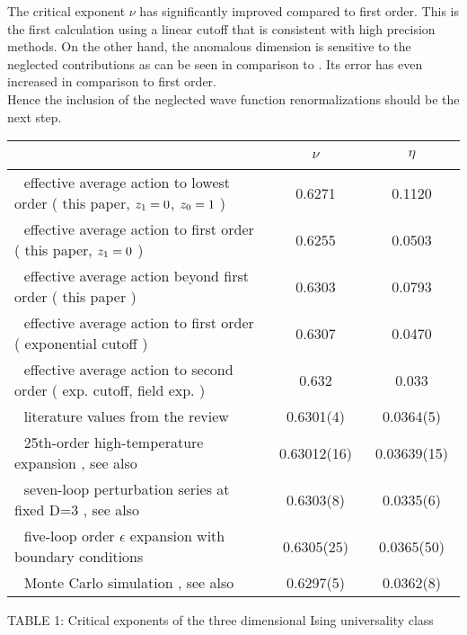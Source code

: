 \documentclass[a4paper,aps,prl,twocolumn,groupedaddress]{revtex4}
\begin{document}
\noindent
The critical exponent $\nu$ has significantly improved compared to 
first order. This is the first calculation using a linear cutoff that is consistent with
high precision methods. On the other hand, the anomalous dimension is sensitive to the 
neglected contributions as can be seen in comparison to \cite{Lit5a}.
Its error has even increased in comparison to first order. \\
Hence the inclusion of the neglected wave function renormalizations should be the next step.



\onecolumngrid
\begin{center}
\begin{tabular}{|l|c|c|}
\hline
~&$\nu$&$\eta$\\
\hline
$~~~$effective average action to lowest order ( this paper, $z_1=0$, $z_0=1$ )&0.6271&0.1120\\
$~~~$effective average action to first order ( this paper, $z_1=0$ )&0.6255&0.0503\\
$~~~$effective average action beyond first order ( this paper ) &0.6303&0.0793\\
$~~~$effective average action to first order ( exponential cutoff \cite{Lit7a} )&0.6307&0.0470\\
$~~~$effective average action to second order ( exp. cutoff, field exp. \cite{Lit5a} ) &0.632&0.033\\
\hline
$~~~$literature values from the review \cite{Lit7}&0.6301(4)&0.0364(5)\\
\hline
$~~~$25th-order high-temperature expansion \cite{HighT1}, see also \cite{HighT2}&$~~~$0.63012(16)$~~~$&$~~~$0.03639(15)$~~~$\\
$~~~$seven-loop perturbation series at fixed D=3 \cite{dExp}, see also \cite{eExp}$~~~$&0.6303(8)&0.0335(6)\\
$~~~$five-loop order $\epsilon$ expansion with boundary conditions \cite{eExp}&0.6305(25)&0.0365(50)\\
$~~~$Monte Carlo simulation \cite{Monte1}, see also \cite{Monte2,Monte3}&0.6297(5)&0.0362(8)\\
\hline
\end{tabular}

\medskip\noindent
TABLE 1: Critical exponents of the three dimensional Ising universality class
\end{center}
\twocolumngrid
\end{document}
